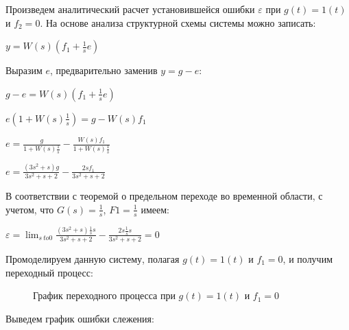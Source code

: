 \documentclass[a4paper, 11pt]{article}
\begin{document}
\par 
Произведем аналитический расчет установившейся ошибки $\varepsilon$ при $g(t)=1(t)$  и $f_2=0$. На основе анализа структурной схемы системы можно записать:
\par 
$\displaystyle y=W(s)(f_1+\frac{1}{s}e)$
\par 
Выразим $e$, предварительно заменив $y=g-e$:
\par 
$\displaystyle g-e=W(s)(f_1+\frac{1}{s}e)$
\par 
$\displaystyle e(1+W(s)\frac{1}{s})=g-W(s)f_1$
\par 
$e=\displaystyle \frac{g}{1+W(s)\frac{1}{s}}-\frac{W(s)f_1}{1+W(s)\frac{1}{s}}$
\par 
$e=\displaystyle \frac{(3s^2+s)g}{3s^2+s+2}-\frac{2sf_1}{3s^2+s+2}$
\par 
В соответствии с теоремой о предельном переходе во временной области, с учетом, что $G(s) = \frac{1}{s}$, $F1= \frac{1}{s}$ имеем:
\par 
$\varepsilon=\lim_{s\ to 0}\displaystyle\frac{(3s^2+s)\frac{1}{s}s}{3s^2+s+2}-\frac{2s\frac{1}{s}s}{3s^2+s+2}=0$
\par 
Промоделируем данную систему, полагая $g(t)=1(t)$  и $f_1=0$, и получим переходный процесс:

\newpage
\begin{figure}[h!]
\caption{График переходного процесса при $g(t)=1(t)$  и $f_1=0$}
\label{ris:image}
\end{figure}

\par 
Выведем график ошибки слежения:
\end{document}

